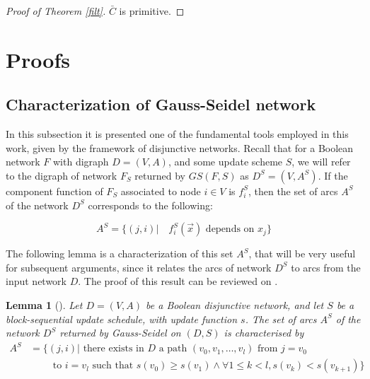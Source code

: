 \documentclass[preprint,12pt]{elsarticle}
\newcommand{\STG}{\textit{STG}}
\newcommand{\GS}{\textit{GS}}
\newtheorem {lema}[teo]{Lemma}
\begin{document}
\begin{proof}[Proof of Theorem \ref{filt}]
$\bar{C}$ is primitive. %
\end{proof}


\appendix

\section{Proofs}\label{sec-proof}

\subsection{Characterization of Gauss-Seidel network}

In this subsection it is presented one of the fundamental tools employed in this work, given by the framework of disjunctive networks. Recall that for a Boolean network $F$ with digraph $D=(V,A)$, and some update scheme $S$, we will refer to the digraph of network $F_S$ returned by $\GS(F,S)$ as $D^S=(V,A^S)$. %
If the component function of $F_S$ associated to node $i \in V$ is $f_i^S$, then the set of arcs $A^S$ of the network $D^S$ corresponds %
to the following:

$$A^S=\{(j,i) |\quad f_i^S(\vec{x}) \text{ depends on } x_j\}$$ 

The following lemma is a characterization of this set $A^S$, that will be very useful for subsequent arguments, since it relates the arcs of network $D^S$ to arcs from the input network $D$. The proof of this result can be reviewed on \cite{disj}. %
    
\begin{lema}[\cite{disj}]\label{caract_disj}
Let $D=(V,A)$ be a Boolean disjunctive network, and let $S$ be a block-sequential update schedule, with update function $s$. The set of arcs $A^S$ of the network $D^S$ returned by Gauss-Seidel on $(D,S)$ is characterised by 
\begin{align*}
A^S &= \{(j,i)| \text{ there exists in $D$ a path } (v_0,v_1,\ldots,v_l) \text{ from } j=v_0\\
&\qquad\text{ to } i=v_l\text{ such that } s(v_0)\geq s(v_1) \wedge \forall 1\leq k < l, s(v_{k})<s(v_{k+1}) \}
\end{align*}
\end{lema}
\end{document}
